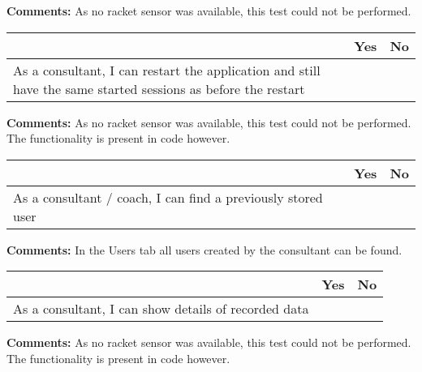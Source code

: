 \vspace{3mm}
\textbf{Comments:}
As no racket sensor was available, this test could not be performed.
\vspace{3mm}


\begin{tabularx}{\textwidth}{|b|c|c|}
	\hline
	 & Yes & No \\
	\hline
	As a consultant, I can restart the application and still have the same started sessions as before the restart &   & \xmark  \\
	\hline
\end{tabularx}

\vspace{3mm}
\textbf{Comments:}
As no racket sensor was available, this test could not be performed. 
The functionality is present in code however.
\vspace{3mm}


\begin{tabularx}{\textwidth}{|b|c|c|}
	\hline
	 & Yes & No \\
	\hline
	As a consultant / coach, I can find a previously stored user & \xmark  &  \\
	\hline
\end{tabularx}

\vspace{3mm}
\textbf{Comments:}
In the Users tab all users created by the consultant can be found.
\vspace{3mm}


\begin{tabularx}{\textwidth}{|b|c|c|}
	\hline
	 & Yes & No \\
	\hline
	As a consultant, I can show details of recorded data &   & \xmark  \\
	\hline
\end{tabularx}

\vspace{3mm}
\textbf{Comments:}
As no racket sensor was available, this test could not be performed. 
The functionality is present in code however.
\vspace{3mm}


